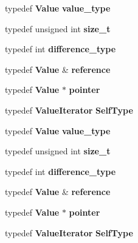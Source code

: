 \begin{DoxyCompactItemize}
\item 
typedef {\bf Value} {\bfseries value\+\_\+type}\label{class_json_1_1_value_iterator_a2c5ba7be611f05546530c8a88b2d2e37}

\item 
typedef unsigned int {\bfseries size\+\_\+t}\label{class_json_1_1_value_iterator_a308b8932ffc83eaa9d12dadd5c11a7dd}

\item 
typedef int {\bfseries difference\+\_\+type}\label{class_json_1_1_value_iterator_a2be1a9aa60bbfc8812e9dd1a7f1a8786}

\item 
typedef {\bf Value} \& {\bfseries reference}\label{class_json_1_1_value_iterator_ae87929b4567aa00372cf602c43b57160}

\item 
typedef {\bf Value} $\ast$ {\bfseries pointer}\label{class_json_1_1_value_iterator_acec45feb1ef1f3bf81240157d06d5432}

\item 
typedef {\bf Value\+Iterator} {\bfseries Self\+Type}\label{class_json_1_1_value_iterator_a23357670fdad61792670d86f62db7e16}

\item 
typedef {\bf Value} {\bfseries value\+\_\+type}\label{class_json_1_1_value_iterator_a2c5ba7be611f05546530c8a88b2d2e37}

\item 
typedef unsigned int {\bfseries size\+\_\+t}\label{class_json_1_1_value_iterator_a308b8932ffc83eaa9d12dadd5c11a7dd}

\item 
typedef int {\bfseries difference\+\_\+type}\label{class_json_1_1_value_iterator_a2be1a9aa60bbfc8812e9dd1a7f1a8786}

\item 
typedef {\bf Value} \& {\bfseries reference}\label{class_json_1_1_value_iterator_ae87929b4567aa00372cf602c43b57160}

\item 
typedef {\bf Value} $\ast$ {\bfseries pointer}\label{class_json_1_1_value_iterator_acec45feb1ef1f3bf81240157d06d5432}

\item 
typedef {\bf Value\+Iterator} {\bfseries Self\+Type}\label{class_json_1_1_value_iterator_a23357670fdad61792670d86f62db7e16}

\end{DoxyCompactItemize}
